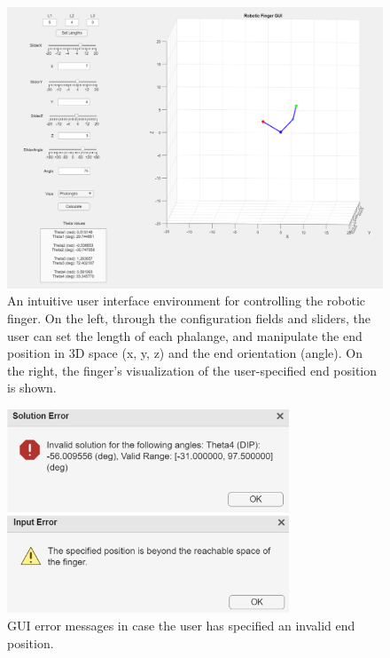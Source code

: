 \documentclass[a4paper,12pt]{article}
\begin{document}
\begin{figure}[htbp]
    \centering
    \includegraphics[width=1\textwidth]{img/GUI_full.png}
    \caption{An intuitive user interface environment for controlling the robotic finger. On the left, through the configuration fields and sliders, the user can set the length of each phalange, and manipulate the end position in 3D space (x, y, z) and the end orientation (angle). On the right, the finger's visualization of the user-specified end position is shown.}
    \label{fig:GUI_full}
\end{figure}

\begin{figure}[htbp]
    \centering
    \includegraphics[width=0.75\textwidth]{img/GUI_error.png}
    \caption{GUI error messages in case the user has specified an invalid end position.}
    \label{fig:GUI_error}
\end{figure}
\end{document}
